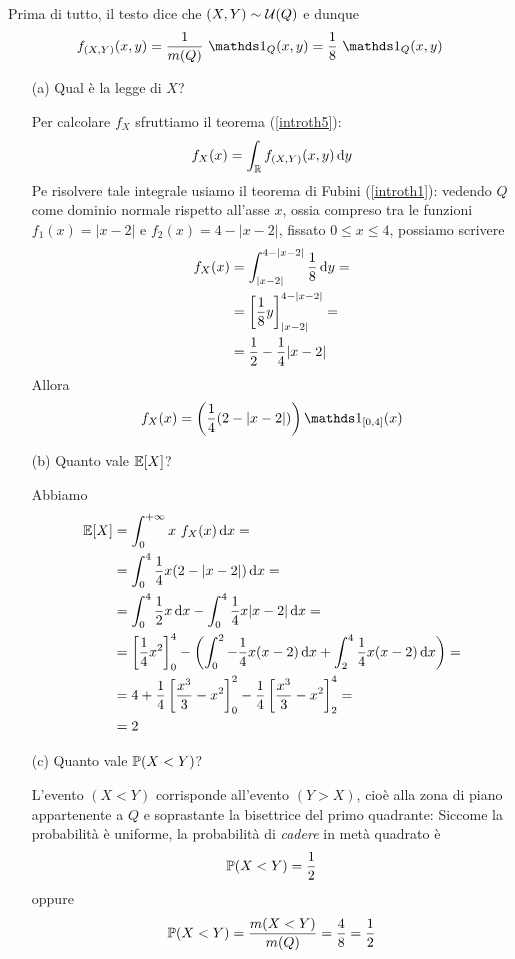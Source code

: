 \Soluzione{}
Prima di tutto, il testo dice che $(X,Y)\sim\mathcal{U}(Q)$ e dunque
\[
\fXYxy=\frac{1}{m(Q)}\ \Ind_Q(x,y)=\frac{1}{8}\ \Ind_Q(x,y)
\]
\begin{enumerate}
\item [(a)] Qual è la legge di $X$?

Per calcolare $f_X$ sfruttiamo il teorema (\ref{introth5}):
\[
f_X(x)=\int_{\mathbb{R}}f_{(X,Y)}(x,y)\, \mathrm{d} y
\]
Pe risolvere tale integrale usiamo il teorema di Fubini (\ref{introth1}): vedendo $Q$ come dominio normale rispetto all'asse $x$, ossia compreso tra le funzioni $f_1(x)=|x-2|$ e $f_2(x)=4-|x-2|$, fissato $0\leq x\leq4$, possiamo scrivere
\begin{gather*}
\begin{aligned}
f_X(x)&=\int_{|x-2|}^{4-|x-2|}\frac{1}{8}\, \mathrm{d} y=\\
&=\left[\frac{1}{8} y  \right]_{|x-2|}^{4-|x-2|}=\\
&=\frac{1}{2}-\frac{1}{4}|x-2|
\end{aligned}
\end{gather*}
Allora
\[
f_X(x)=\left(\frac{1}{4}(2-|x-2|)  \right)\Ind_{[0,4]}(x)
\]

\item [(b)] Quanto vale $\mathbb{E}[X]$?

Abbiamo
\begin{gather*}
\begin{aligned}
\mathbb{E}[X]&=\int_{0}^{+\infty} x\ f_X(x)\, \mathrm{d} x=\\
&=\int_0^4 \frac{1}{4}x(2-|x-2|)\, \mathrm{d} x=\\
&=\int_0^4 \frac{1}{2}x\, \mathrm{d} x-\int_0^4 \frac{1}{4}x|x-2|\, \mathrm{d} x=\\
&=\left[\frac{1}{4}x^2\right]_0^4-\left(\int_0^2 -\frac{1}{4}x(x-2)\, \mathrm{d} x+\int_2^4 \frac{1}{4}x(x-2)\, \mathrm{d} x  \right)=\\
&=4+\frac{1}{4}\left[ \frac{x^3}{3}-x^2 \right]_0^2-\frac{1}{4}\left[\frac{x^3}{3}-x^2  \right]_2^4=\\
&=2
\end{aligned}
\end{gather*}

\item [(c)] Quanto vale $\mathbb{P}(X<Y)$?

L'evento $(X<Y)$ corrisponde all'evento $(Y>X)$, cioè alla zona di piano appartenente a $Q$ e soprastante la bisettrice del primo quadrante:
Siccome la probabilità è uniforme, la probabilità di \emph{cadere} in metà quadrato è 
\[
\mathbb{P}(X<Y)=\frac{1}{2}
\]
oppure
\[
\mathbb{P}(X<Y)=\frac{m(X<Y)}{m(Q)}=\frac{4}{8}=\frac{1}{2}
\]


\end{enumerate}
